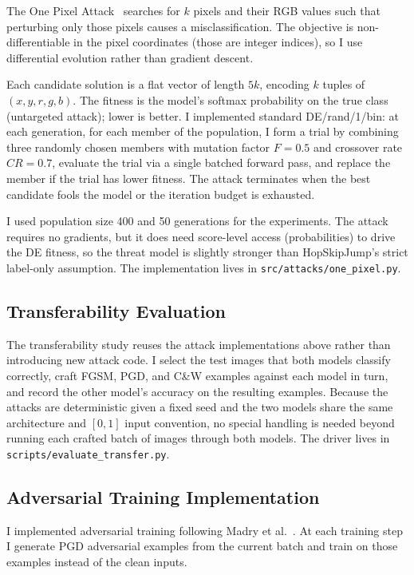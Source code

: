 The One Pixel Attack~\cite{su2019onepixel} searches for $k$ pixels and their RGB values such that perturbing only those pixels causes a misclassification. The objective is non-differentiable in the pixel coordinates (those are integer indices), so I use differential evolution rather than gradient descent.

Each candidate solution is a flat vector of length $5k$, encoding $k$ tuples of $(x, y, r, g, b)$. The fitness is the model's softmax probability on the true class (untargeted attack); lower is better. I implemented standard DE/rand/1/bin: at each generation, for each member of the population, I form a trial by combining three randomly chosen members with mutation factor $F = 0.5$ and crossover rate $CR = 0.7$, evaluate the trial via a single batched forward pass, and replace the member if the trial has lower fitness. The attack terminates when the best candidate fools the model or the iteration budget is exhausted.

I used population size 400 and 50 generations for the experiments. The attack requires no gradients, but it does need score-level access (probabilities) to drive the DE fitness, so the threat model is slightly stronger than HopSkipJump's strict label-only assumption. The implementation lives in \texttt{src/attacks/one\_pixel.py}.

\subsection{Transferability Evaluation}

The transferability study reuses the attack implementations above rather than introducing new attack code. I select the test images that both models classify correctly, craft FGSM, PGD, and C\&W examples against each model in turn, and record the other model's accuracy on the resulting examples. Because the attacks are deterministic given a fixed seed and the two models share the same architecture and $[0, 1]$ input convention, no special handling is needed beyond running each crafted batch of images through both models. The driver lives in \texttt{scripts/evaluate\_transfer.py}.

\subsection{Adversarial Training Implementation}

I implemented adversarial training following Madry et al.~\cite{madry2018towards}. At each training step I generate PGD adversarial examples from the current batch and train on those examples instead of the clean inputs.

